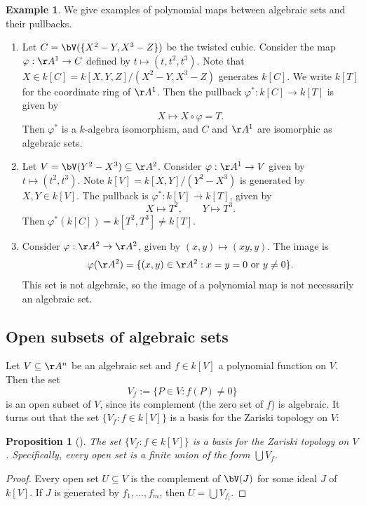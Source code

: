 \documentclass[12pt]{amsart}
\theoremstyle{plain}
\newtheorem{proposition}[theorem]{Proposition}
\theoremstyle{definition}
\newtheorem{example}[theorem]{Example}
\begin{document}
\begin{example}\label{example:polynomialmaps}
We give examples of polynomial maps between algebraic sets and their pullbacks.
\begin{enumerate}
\item 
Let $C = \bV(\{X^2-Y, X^3-Z\})$ be the twisted cubic.
Consider the map $\varphi : \AA^1 \to C$ defined by $t \mapsto (t, t^2, t^3)$.
Note that $X \in k[C] = k[X, Y, Z]/(X^2-Y, X^3-Z)$ generates $k[C]$.
We write $k[T]$ for the coordinate ring of $\AA^1$.
Then the pullback $\varphi^* : k[C] \to k[T]$ is given by
$$X \mapsto X \circ \varphi = T.$$
Then $\varphi^*$ is a $k$-algebra isomorphism, and $C$ and $\AA^1$ are isomorphic as algebraic sets.

\item
Let $V = \bV(Y^2-X^3)\subseteq\AA^2$.
Consider $\varphi:\AA^1 \to V$ given by $t \mapsto (t^2, t^3)$.
Note $k[V] = k[X, Y]/(Y^2 - X^3)$ is generated by $X, Y \in k[V]$.
The pullback is $\varphi^*:k[V] \to k[T]$, given by
$$X \mapsto T^2, \qquad Y \mapsto T^3.$$
Then $\varphi^*(k[C]) = k[T^2, T^3] \ne k[T]$.

\item
Consider $\varphi:\AA^2 \to \AA^2$, given by $(x, y) \mapsto (xy, y)$.
The image is
$$\varphi(\AA^2) = \{(x,y) \in \AA^2 : x=y=0 \text{ or } y \ne 0\}.$$
This set is not algebraic, so the image of a polynomial map is not necessarily an algebraic set.
\end{enumerate}
\end{example}





\subsection{Open subsets of algebraic sets}\label{section:opensubsetsofalgebraicsets}
Let $V \subseteq \AA^n$ be an algebraic set and $f \in k[V]$ a polynomial function on $V$.
Then the set
$$V_f := \{P \in V : f(P) \ne 0\}$$
is an open subset of $V$, since its complement (the zero set of $f$) is algebraic.
It turns out that the set $\{V_f : f \in k[V]\}$ is a basis for the Zariski topology on $V$:

\begin{proposition}[{\cite[Proposition 2.37]{Milne13}}]
The set $\{V_f : f \in k[V]\}$ is a basis for the Zariski topology on $V$.
Specifically, every open set is a finite union of the form $\bigcup V_f$.
\end{proposition}
\begin{proof}
Every open set $U \subseteq V$ is the complement of $\bV(J)$ for some ideal $J$ of $k[V]$.
If $J$ is generated by $f_1, \ldots, f_m$, then $U = \bigcup V_{f_i}.$
\end{proof}
\end{document}
